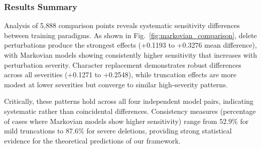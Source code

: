 \documentclass[letterpaper]{article} %
\begin{document}
\subsubsection{Results Summary}
Analysis of 5,888 comparison points reveals systematic sensitivity differences between training paradigms. As shown in Fig.~\ref{fig:markovian_comparison}, delete perturbations produce the strongest effects (+0.1193 to +0.3276 mean difference), with Markovian models showing consistently higher sensitivity that increases with perturbation severity. Character replacement demonstrates robust differences across all severities (+0.1271 to +0.2548), while truncation effects are more modest at lower severities but converge to similar high-severity patterns.

Critically, these patterns hold across all four independent model pairs, indicating systematic rather than coincidental differences. Consistency measures (percentage of cases where Markovian models show higher sensitivity) range from 52.9\% for mild truncations to 87.6\% for severe deletions, providing strong statistical evidence for the theoretical predictions of our framework.
\end{document}
